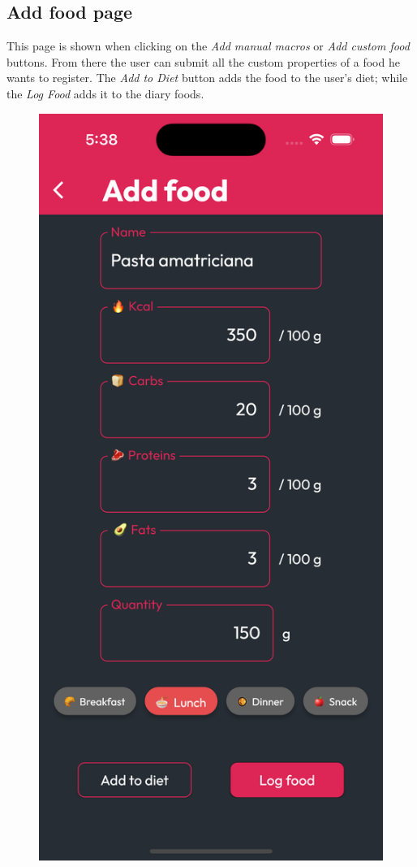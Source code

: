 \documentclass{Configuration_Files/PoliMi3i_thesis}
\begin{document}
\clearpage

\subsection{Add food page}

\begin{minipage}{\linewidth}
    This page is shown when clicking on the \emph{Add manual macros} or \emph{Add custom food} buttons. From there the user can submit all the custom properties of a food he wants to register.
    The \emph{Add to Diet} button adds the food to the user's diet; while the \emph{Log Food} adds it to the diary foods.
\end{minipage}

\begin{figure}[!h]
  \centering
  \includegraphics[scale=0.1]{Images/Screenshots/Mobile/AddFood.png}

\end{figure}
\end{document}
